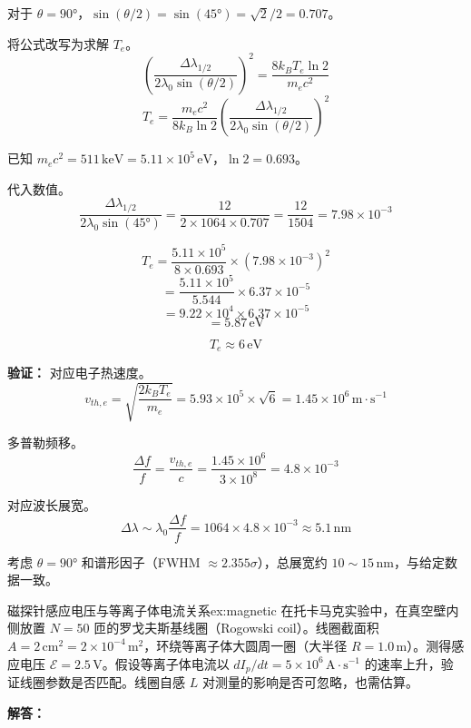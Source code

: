 对于 $\theta = 90°$，$\sin(\theta/2) = \sin(45°) = \sqrt{2}/2 = 0.707$。

将公式改写为求解 $T_e$。
\[
    \left(\frac{\Delta\lambda_{1/2}}{2\lambda_0 \sin(\theta/2)}\right)^2 = \frac{8k_B T_e \ln 2}{m_e c^2}
\]
\begin{equation}
    T_e = \frac{m_e c^2}{8k_B \ln 2} \left(\frac{\Delta\lambda_{1/2}}{2\lambda_0 \sin(\theta/2)}\right)^2
\label{eq:ch12-thomson-temperature}
\end{equation}

已知 $m_e c^2 = 511\,\mathrm{keV} = 5.11\times10^5\,\mathrm{eV}$，$\ln 2 = 0.693$。

代入数值。
\[
    \frac{\Delta\lambda_{1/2}}{2\lambda_0 \sin(45°)} = \frac{12}{2\times1064\times0.707} = \frac{12}{1504} = 7.98\times10^{-3}
\]

\[
    T_e = \frac{5.11\times10^5}{8\times0.693} \times (7.98\times10^{-3})^2
\]
\[
    = \frac{5.11\times10^5}{5.544} \times 6.37\times10^{-5}
\]
\[
    = 9.22\times10^4 \times 6.37\times10^{-5}
\]
\[
    = 5.87\,\mathrm{eV}
\]

\[
    \boxed{T_e \approx 6\,\mathrm{eV}}
\]

\textbf{验证：} 对应电子热速度。
\[
    v_{th,e} = \sqrt{\frac{2k_B T_e}{m_e}} = 5.93\times10^5\times\sqrt{6} = 1.45\times10^6\,\mathrm{m\cdot s^{-1}}
\]

多普勒频移。
\[
    \frac{\Delta f}{f} = \frac{v_{th,e}}{c} = \frac{1.45\times10^6}{3\times10^8} = 4.8\times10^{-3}
\]

对应波长展宽。
\[
    \Delta\lambda \sim \lambda_0 \frac{\Delta f}{f} = 1064\times 4.8\times10^{-3} \approx 5.1\,\mathrm{nm}
\]

考虑 $\theta = 90°$ 和谱形因子（FWHM $\approx 2.355\sigma$），总展宽约 $10\sim15\,\mathrm{nm}$，与给定数据一致。


\begin{example}{磁探针感应电压与等离子体电流关系}{ex:magnetic}
在托卡马克实验中，在真空壁内侧放置 $N=50$ 匝的罗戈夫斯基线圈（Rogowski coil）。线圈截面积 $A = 2\,\mathrm{cm^2} = 2\times10^{-4}\,\mathrm{m^2}$，环绕等离子体大圆周一圈（大半径 $R=1.0\,\mathrm{m}$）。测得感应电压 $\mathcal{E} = 2.5\,\mathrm{V}$。假设等离子体电流以 $dI_p/dt = 5\times10^6\,\mathrm{A\cdot s^{-1}}$ 的速率上升，验证线圈参数是否匹配。线圈自感 $L$ 对测量的影响是否可忽略，也需估算。
\end{example}

\textbf{解答：}


